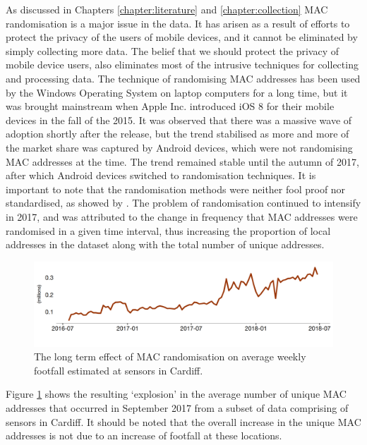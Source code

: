 As discussed in Chapters \ref{chapter:literature} and \ref{chapter:collection} MAC randomisation is a major issue in the data.
It has arisen as a result of efforts to protect the privacy of the users of mobile devices, and it cannot be eliminated by simply collecting more data.
The belief that we should protect the privacy of mobile device users, also eliminates most of the intrusive techniques for collecting and processing data.
The technique of randomising MAC addresses has been used by the Windows Operating System on laptop computers for a long time, but it was brought mainstream when Apple Inc. introduced iOS 8 for their mobile devices in the fall of the 2015.
It was observed that there was a massive wave of adoption shortly after the release, but the trend stabilised as more and more of the market share was captured by Android devices, which were not randomising MAC addresses at the time.
The trend remained stable until the autumn of 2017, after which Android devices switched to randomisation techniques.
It is important to note that the randomisation methods were neither fool proof nor standardised, as showed by \citep{vanhoef2016}.
The problem of randomisation continued to intensify in 2017, and was attributed to the change in frequency that MAC addresses were randomised in a given time interval, thus increasing the proportion of local addresses in the dataset along with the total number of unique addresses.

\begin{figure}
  \includegraphics[trim={0 0 0 0},clip]{images/processing-error-randomisation.png}
  \caption{The long term effect of MAC randomisation on average weekly footfall estimated at sensors in Cardiff.}
  \label{figure:processing:error:random}
\end{figure}

Figure \ref{figure:processing:error:random} shows the resulting ‘explosion’ in the average number of unique MAC addresses that occurred in September 2017 from a subset of data comprising of sensors in Cardiff.
It should be noted that the overall increase in the unique MAC addresses is not due to an increase of footfall at these locations.

